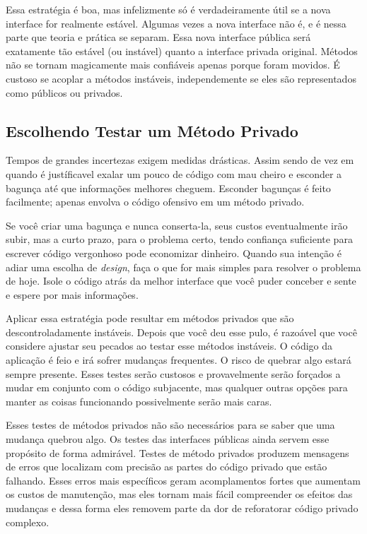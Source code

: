 Essa estratégia é boa, mas infelizmente só é verdadeiramente útil se a nova
interface for realmente estável. Algumas vezes a nova interface não é, e é nessa
parte que teoria e prática se separam. Essa nova interface pública será
exatamente tão estável (ou instável) quanto a interface privada original.
Métodos não se tornam magicamente mais confiáveis apenas porque foram movidos.
É custoso se acoplar a métodos instáveis, independemente se eles são
representados como públicos ou privados.

\subsection{ Escolhendo Testar um Método Privado }

Tempos de grandes incertezas exigem medidas drásticas. Assim sendo de vez em
quando é justíficavel exalar um pouco de código com mau cheiro e esconder a
bagunça até que informações melhores cheguem. Esconder bagunças é feito
facilmente; apenas envolva o código ofensivo em um método privado.

Se você criar uma bagunça e nunca conserta-la, seus custos eventualmente irão
subir, mas a curto prazo, para o problema certo, tendo confiança suficiente para
escrever código vergonhoso pode economizar dinheiro. Quando sua intenção é adiar
uma escolha de \textit{design}, faça o que for mais simples para resolver o
problema de hoje. Isole o código atrás da melhor interface que você puder
conceber e sente e espere por mais informações.

Aplicar essa estratégia pode resultar em métodos privados que são
descontroladamente instáveis. Depois que você deu esse pulo, é razoável que
você considere ajustar seu pecados ao testar esse métodos instáveis. O
código da aplicação é feio e irá sofrer mudanças frequentes. O risco de quebrar
algo estará sempre presente. Esses testes serão custosos e provavelmente serão
forçados a mudar em conjunto com o código subjacente, mas qualquer outras opções
para manter as coisas funcionando possivelmente serão mais caras.

Esses testes de métodos privados não são necessários para se saber que uma
mudança quebrou algo. Os testes das interfaces públicas ainda servem esse
propósito de forma admirável. Testes de método privados produzem mensagens de
erros que localizam com precisão as partes do código privado que estão falhando.
Esses erros mais específicos geram acomplamentos fortes que aumentam os custos
de manutenção, mas eles tornam mais fácil compreender os efeitos das mudanças e
dessa forma eles removem parte da dor de reforatorar código privado complexo.

